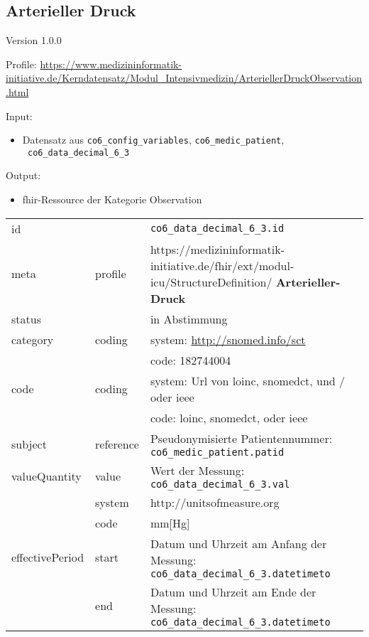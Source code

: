 \subsection{Arterieller Druck} 
\noindent Version 1.0.0

\noindent Profile: \url{https://www.medizininformatik-initiative.de/Kerndatensatz/Modul_Intensivmedizin/ArteriellerDruckObservation.html}

\noindent Input:
\begin{itemize}
	\item Datensatz aus \texttt{co6\_config\_variables}, \texttt{co6\_medic\_patient}, \\ \texttt{
co6\_data\_decimal\_6\_3}
\end{itemize}
Output:
\begin{itemize}
        \item \ac{fhir}-Ressource der Kategorie \glqq Observation\grqq{}
\end{itemize}
\begin{longtable}{|l|l|p{7.5cm}|}
        \hline
        \rowcolor{lightgray} \multicolumn{3}{|l|}{Data Mapping (inhaltlich)} \\ \hline
        id &  & \texttt{co6\_data\_decimal\_6\_3.id} \\ \hline
	meta & profile & https://medizininformatik-initiative.de/fhir/ext/modul-icu/StructureDefinition/\textbf{
Arterieller-Druck} \\ \hline 
	status &  & in Abstimmung  \\ \hline 
	category & coding & system: \url{http://snomed.info/sct} \\
\cline{3-3}
	& & code: 182744004 \\ \hline
	code & coding & system: Url von \ac{loinc}, \ac{snomedct}, und / oder \ac{ieee} \\ 
	\cline{3-3} 
	 &  & code: \ac{loinc}, \ac{snomedct}, oder \ac{ieee} \\ \hline
	subject & reference & Pseudonymisierte Patientennummer: \texttt{co6\_medic\_patient.patid} \\ \hline
	valueQuantity & value & Wert der Messung: \texttt{
co6\_data\_decimal\_6\_3.val} \\
        \cline{2-3}
         & system & http://unitsofmeasure.org \\
         \cline{2-3}
         & code &
mm[Hg]
\\ \hline
    effectivePeriod & start & Datum und Uhrzeit am Anfang der Messung: \texttt{
co6\_data\_decimal\_6\_3.datetimeto} \\
    \cline{2-3}
     & end & Datum und Uhrzeit am Ende der Messung: \texttt{
co6\_data\_decimal\_6\_3.datetimeto} \\ \hline
\end{longtable}


